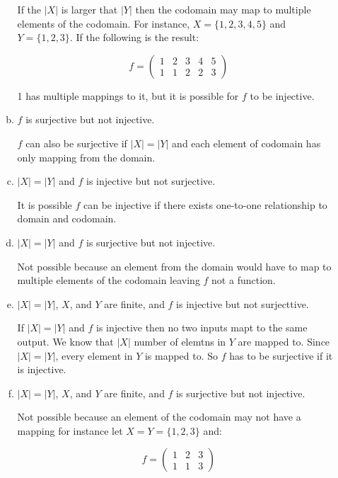 \documentclass[11pt, a4paper]{article}
\begin{document}
\begin{enumerate}
\begin{enumerate}[(a)]
                If the $|X|$ is larger that $|Y|$ then the codomain may map to multiple elements of the codomain. For instance, $X = \{1,2,3,4,5\}$ and $Y = \{1,2,3\}$. If the following is the result:

                $$ f = \begin{pmatrix} 1 & 2 & 3 & 4 & 5 \\ 1 & 1 & 2 & 2 & 3 \end{pmatrix} $$

                1 has multiple mappings to it, but it is possible for $f$ to be injective.

            \item $f$ is surjective but not injective.

            $f$ can also be surjective if $|X| = |Y|$ and each element of codomain has only mapping from the domain.

            \item $|X| = |Y|$ and $f$ is injective but not surjective.

        It is possible $f$ can be injective if there exists one-to-one relationship to domain and codomain.

            \item $|X| = |Y|$ and $f$ is surjective but not injective.

                Not possible because an element from the domain would have to map to multiple elements of the codomain leaving $f$ not a function.


            \item $|X| = |Y|$, $X$, and $Y$ are finite, and $f$ is injective but not surjecttive.             

            If $|X| = |Y|$ and $f$ is injective then no two inputs mapt to the same output. We know that $|X|$ number of elemtns in $Y$ are mapped to. Since $|X| = |Y|$, every element in $Y$ is mapped to. So $f$ has to be surjective if it is injective.

            \item $|X| = |Y|$, $X$, and $Y$ are finite, and $f$ is surjective but not injective.

                Not possible because an element of the codomain may not have a mapping for instance let $X = Y = \{1,2,3\}$ and:

                $$f = \begin{pmatrix} 1 & 2 & 3 \\ 1 & 1 & 3\end{pmatrix}$$


\end{enumerate}
\end{enumerate}
\end{document}
